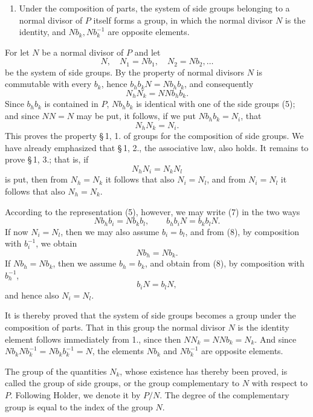 \documentclass[11pt]{article}
\begin{document}
\begin{enumerate}[resume,label=\arabic*.]
\item Under the composition of parts, the system of side groups belonging to a normal divisor of $P$ itself forms a group, in which the normal divisor $N$ is the identity, and $Nb_k,Nb_k^{-1}$ are opposite elements.
\end{enumerate}
For let $N$ be a normal divisor of $P$ and let
\begin{equation}
N,
\quad N_1=Nb_1,
\quad N_2=Nb_2,
\ldots
\tag{5}
\end{equation}
be the system of side groups. By the property of normal divisors $N$ is commutable with every $b_k$, hence $b_hb_kN=Nb_hb_k$, and consequently
\[
N_hN_k=NNb_hb_k.
\]
Since $b_hb_k$ is contained in $P$, $Nb_hb_k$ is identical with one of the side groups (5); and since $NN=N$ may be put, it follows, if we put $Nb_hb_k=N_i$, that
\begin{equation}
N_hN_k=N_i.
\tag{6}
\end{equation}
This proves the property \S\,1, 1. of groups for the composition of side groups. We have already emphasized that \S\,1, 2., the associative law, also holds. It remains to prove \S\,1, 3.; that is, if
\begin{equation}
N_hN_i=N_kN_l
\tag{7}
\end{equation}
is put, then from $N_h=N_k$ it follows that also $N_i=N_l$, and from $N_i=N_l$ it follows that also $N_h=N_k$.

According to the representation (5), however, we may write (7) in the two ways
\begin{equation}
Nb_hb_i=Nb_kb_l,
\qquad b_hb_iN=b_kb_lN.
\tag{8}
\end{equation}
If now $N_i=N_l$, then we may also assume $b_i=b_l$, and from (8), by composition with $b_i^{-1}$, we obtain
\[
Nb_h=Nb_k.
\]
If $Nb_h=Nb_k$, then we assume $b_h=b_k$, and obtain from (8), by composition with $b_h^{-1}$,
\[
b_iN=b_lN,
\]
and hence also $N_i=N_l$.

It is thereby proved that the system of side groups becomes a group under the composition of parts. That in this group the normal divisor $N$ is the identity element follows immediately from 1., since then $NN_k=NNb_k=N_k$. And since $Nb_kNb_k^{-1}=Nb_kb_k^{-1}=N$, the elements $Nb_k$ and $Nb_k^{-1}$ are opposite elements.

The group of the quantities $N_k$, whose existence has thereby been proved, is called the group of side groups, or the group complementary to $N$ with respect to $P$. Following Holder, we denote it by $P/N$. The degree of the complementary group is equal to the index of the group $N$.
\end{document}
